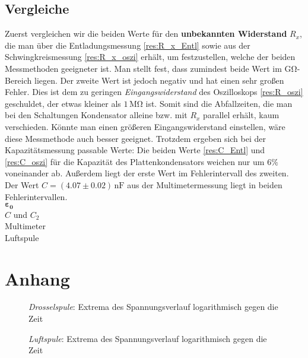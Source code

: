 \documentclass[12pt,a4paper,titlepage,headinclude,bibtotoc]{scrartcl}
\begin{document}
\subsection{Vergleiche}
Zuerst vergleichen wir die beiden Werte für den \textbf{unbekannten Widerstand} $R_x$, die man über die Entladungsmessung \eqref{res:R_x_Entl} sowie aus der Schwingkreismessung \eqref{res:R_x_oszi} erhält, um festzustellen, welche der beiden Messmethoden geeigneter ist.
Man stellt fest, dass zumindest beide Wert im $\si{\giga\ohm}$-Bereich liegen.
Der zweite Wert ist jedoch negativ und hat einen sehr großen Fehler.
Dies ist dem zu geringen \textit{Eingangswiderstand} des Oszilloskops \eqref{res:R_oszi} geschuldet, der etwas kleiner als $1\,\si{\mega\ohm}$ ist.
Somit sind die Abfallzeiten, die man bei den Schaltungen Kondensator alleine bzw. mit $R_x$ parallel erhält, kaum verschieden.
Könnte man einen größeren Eingangswiderstand einstellen, wäre diese Messmethode auch besser geeignet.
Trotzdem ergeben sich bei der Kapazitätsmessung passable Werte: Die beiden Werte \eqref{res:C_Entl} und \eqref{res:C_oszi} für die Kapazität des Plattenkondensators weichen nur um $6\%$ voneinander ab.
Außerdem liegt der erste Wert im Fehlerintervall des zweiten.
Der Wert $C=(4.07 \pm 0.02) \,\si{\nano\farad}$ aus der Multimetermessung liegt in beiden Fehlerintervallen.\\
$\mathbf{\boldsymbol\varepsilon_0}$\\
$C$ und $C_2$\\
Multimeter\\
Luftspule

\section{Anhang}
\begin{figure}[!htb]
	\centering
	
	\caption{\textit{Drosselspule}: Extrema des Spannungsverlauf logarithmisch gegen die Zeit}
	\label{fig:Drosselspule}
\end{figure}

\begin{figure}[!htb]
	\centering
	
	\caption{\textit{Luftspule}: Extrema des Spannungsverlauf logarithmisch gegen die Zeit}
	\label{fig:Luftspule}
\end{figure}
\end{document}
